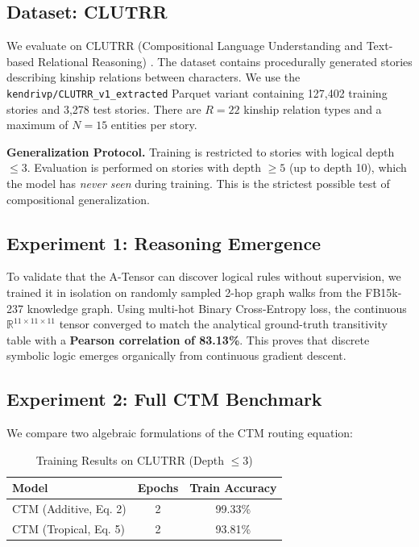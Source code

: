 \documentclass[11pt,a4paper]{article}
\begin{document}
\subsection{Dataset: CLUTRR}
We evaluate on CLUTRR (Compositional Language Understanding and Text-based Relational Reasoning) \cite{sinha2019clutrr}. The dataset contains procedurally generated stories describing kinship relations between characters. We use the \texttt{kendrivp/CLUTRR\_v1\_extracted} Parquet variant containing 127,402 training stories and 3,278 test stories. There are $R = 22$ kinship relation types and a maximum of $N = 15$ entities per story.

\textbf{Generalization Protocol.} Training is restricted to stories with logical depth $\leq 3$. Evaluation is performed on stories with depth $\geq 5$ (up to depth 10), which the model has \textit{never seen} during training. This is the strictest possible test of compositional generalization.

\subsection{Experiment 1: Reasoning Emergence}
To validate that the A-Tensor can discover logical rules without supervision, we trained it in isolation on randomly sampled 2-hop graph walks from the FB15k-237 knowledge graph. Using multi-hot Binary Cross-Entropy loss, the continuous $\mathbb{R}^{11 \times 11 \times 11}$ tensor converged to match the analytical ground-truth transitivity table with a \textbf{Pearson correlation of 83.13\%}. This proves that discrete symbolic logic emerges organically from continuous gradient descent.

\subsection{Experiment 2: Full CTM Benchmark}
We compare two algebraic formulations of the CTM routing equation:

\begin{table}[h]
\centering
\caption{Training Results on CLUTRR (Depth $\leq 3$)}
\begin{tabular}{lcc}
\toprule
\textbf{Model} & \textbf{Epochs} & \textbf{Train Accuracy} \\
\midrule
CTM (Additive, Eq. 2) & 2 & 99.33\% \\
CTM (Tropical, Eq. 5) & 2 & 93.81\% \\
\bottomrule
\end{tabular}
\end{table}
\end{document}
